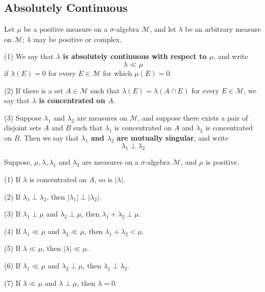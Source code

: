 \documentclass[12pt, a4paper, oneside]{book}
\begin{document}
\subsection{Absolutely Continuous}
\begin{definition}
    Let $\mu$ be a positive measure on a $\sigma$-algebra $\mathcal{M}$, and let $\lambda$ be an arbitrary measure on $\mathcal{M}$; $\lambda$ may be positive or complex.

    (1) We say that \textbf{$\lambda$ is absolutely continuous with respect to $\mu$}, and write
    $$
        \lambda \ll \mu
    $$
    if $\lambda(E)=0$ for every $E \in \mathcal{M}$ for which $\mu(E)=0$.

    (2) If there is a set $A \in \mathcal{M}$ such that $\lambda(E)=\lambda(A \cap E)$ for every $E \in \mathcal{M}$, we say that \textbf{$\lambda$ is concentrated on $A$}.

    (3) Suppose $\lambda_1$ and $\lambda_2$ are measures on $\mathcal{M}$, and suppose there exists a pair of disjoint sets $A$ and $B$ such that $\lambda_1$ is concentrated on $A$ and $\lambda_2$ is concentrated on $B$. Then we say that \textbf{$\lambda_1$ and $\lambda_2$ are mutually singular}, and write
    $$
        \lambda_1 \perp \lambda_2
    $$
\end{definition}
\begin{theorem}
    Suppose, $\mu, \lambda, \lambda_1$ and $\lambda_2$ are measures on a $\sigma$-algebra $\mathcal{M}$, and $\mu$ is positive.

    (1) If $\lambda$ is concentrated on $A$, so is $|\lambda|$.

    (2) If $\lambda_1 \perp \lambda_2$, then $\left|\lambda_1\right| \perp\left|\lambda_2\right|$.

    (3) If $\lambda_1 \perp \mu$ and $\lambda_2 \perp \mu$, then $\lambda_1+\lambda_2 \perp \mu$.

    (4) If $\lambda_1 \ll \mu$ and $\lambda_2 \ll \mu$, then $\lambda_1+\lambda_2<\mu$.

    (5) If $\lambda \ll \mu$, then $|\lambda| \ll \mu$.

    (6) If $\lambda_1 \ll \mu$ and $\lambda_2 \perp \mu$, then $\lambda_1 \perp \lambda_2$.

    (7) If $\lambda \ll \mu$ and $\lambda \perp \mu$, then $\lambda=0$.
\end{theorem}

\subsubsection{}
\end{document}
